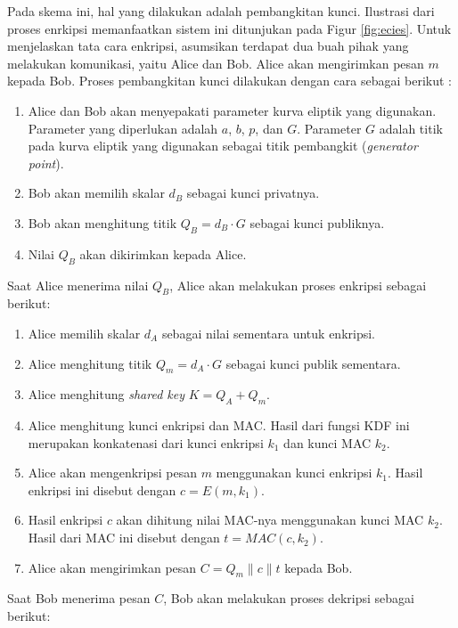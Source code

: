 \documentclass[conference]{IEEEtran}
\begin{document}
Pada skema ini, hal yang dilakukan adalah pembangkitan kunci. Ilustrasi dari proses enrkipsi memanfaatkan sistem ini ditunjukan pada Figur \ref{fig:ecies}. Untuk menjelaskan tata cara enkripsi, asumsikan terdapat dua buah pihak yang melakukan komunikasi, yaitu Alice dan Bob. Alice akan mengirimkan pesan $m$ kepada Bob. Proses pembangkitan kunci dilakukan dengan cara sebagai berikut \cite{ali2016}:

\begin{enumerate}
    \item Alice dan Bob akan menyepakati parameter kurva eliptik yang digunakan. Parameter yang diperlukan adalah $a$, $b$, $p$, dan $G$. Parameter $G$ adalah titik pada kurva eliptik yang digunakan sebagai titik pembangkit (\emph{generator point}).
    \item Bob akan memilih skalar $d_B$ sebagai kunci privatnya.
    \item Bob akan menghitung titik $Q_B = d_B \cdot G$ sebagai kunci publiknya.
    \item Nilai $Q_B$ akan dikirimkan kepada Alice.
\end{enumerate}

Saat Alice menerima nilai $Q_B$, Alice akan melakukan proses enkripsi sebagai berikut:

\begin{enumerate}
    \item Alice memilih skalar $d_A$ sebagai nilai sementara untuk enkripsi.
    \item Alice menghitung titik $Q_m = d_A \cdot G$ sebagai kunci publik sementara.
    \item Alice menghitung \emph{shared key} $K = Q_A + Q_m$.
    \item Alice menghitung kunci enkripsi dan MAC. Hasil dari fungsi KDF ini merupakan konkatenasi dari kunci enkripsi $k_1$ dan kunci MAC $k_2$. 
    \item Alice akan mengenkripsi pesan $m$ menggunakan kunci enkripsi $k_1$. Hasil enkripsi ini disebut dengan $c = E(m, k_1)$.
    \item Hasil enkripsi $c$ akan dihitung nilai MAC-nya menggunakan kunci MAC $k_2$. Hasil dari MAC ini disebut dengan $t = MAC(c, k_2)$.
    \item Alice akan mengirimkan pesan $C = Q_m \parallel c \parallel t$ kepada Bob.
\end{enumerate}

Saat Bob menerima pesan $C$, Bob akan melakukan proses dekripsi sebagai berikut:
\end{document}
